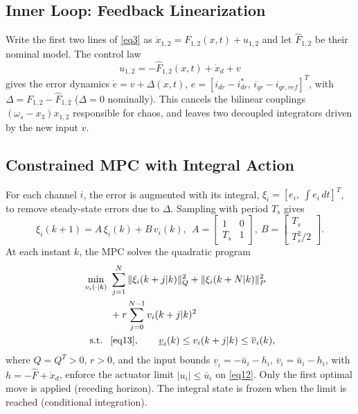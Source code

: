 \documentclass[conference]{IEEEtran}
\begin{document}
\subsection{Inner Loop: Feedback Linearization}

Write the first two lines of \eqref{eq3} as $\dot x_{1,2}=F_{1,2}(x,t)+u_{1,2}$ and let $\hat F_{1,2}$ be their nominal model. The control law
\begin{equation}
u_{1,2} = -\hat F_{1,2}(x,t) + \dot x_d + v
\label{eq12}
\end{equation}
gives the error dynamics $\dot e = v + \Delta(x,t)$, $e=[i_{dr}-i^\ast_{dr},\,i_{qr}-i_{qr,ref}]^T$, with $\Delta=F_{1,2}-\hat F_{1,2}$ ($\Delta=0$ nominally). This cancels the bilinear couplings $(\omega_s-x_3)x_{1,2}$ responsible for chaos, and leaves two decoupled integrators driven by the new input $v$.

\subsection{Constrained MPC with Integral Action}

For each channel $i$, the error is augmented with its integral, $\xi_i=[e_i,\ \int e_i\,dt]^T$, to remove steady-state errors due to $\Delta$. Sampling with period $T_s$ gives
\begin{equation}
\xi_i(k+1) = A\,\xi_i(k) + B\,v_i(k),\ \ A=\begin{bmatrix}1&0\\T_s&1\end{bmatrix}\!,\ B=\begin{bmatrix}T_s\\T_s^2/2\end{bmatrix}\!.
\label{eq13}
\end{equation}
At each instant $k$, the MPC solves the quadratic program
\begin{equation}
\begin{aligned}
\min_{v_i(\cdot|k)}\ & \sum_{j=1}^{N}\|\xi_i(k+j|k)\|_Q^2 + \|\xi_i(k+N|k)\|_P^2\\
& + r\sum_{j=0}^{N-1} v_i(k+j|k)^2\\
\text{s.t. }\ & \eqref{eq13},\qquad \underline v_i(k)\le v_i(k+j|k)\le \overline v_i(k),
\end{aligned}
\label{eq14}
\end{equation}
where $Q=Q^T>0$, $r>0$, and the input bounds $\underline v_i=-\bar u_i-h_i$, $\overline v_i=\bar u_i-h_i$, with $h=-\hat F+\dot x_d$, enforce the actuator limit $|u_i|\le\bar u_i$ on \eqref{eq12}. Only the first optimal move is applied (receding horizon). The integral state is frozen when the limit is reached (conditional integration).
\end{document}
